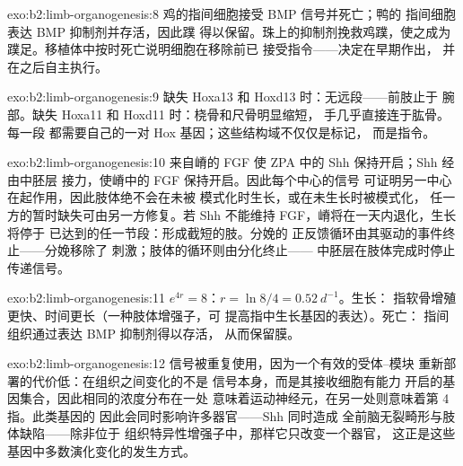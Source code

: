 \begin{solution}{exo:b2:limb-organogenesis:8}
鸡的指间细胞接受 BMP 信号并死亡；鸭的
指间细胞表达 BMP 抑制剂并存活，因此蹼
得以保留。珠上的抑制剂挽救鸡蹼，使之成为
蹼足。移植体中按时死亡说明细胞在移除前已
接受指令——决定在早期作出，
并在之后自主执行。
\end{solution}

\begin{solution}{exo:b2:limb-organogenesis:9}
缺失 Hoxa13 和 Hoxd13 时：无远段——前肢止于
腕部。缺失 Hoxa11 和 Hoxd11 时：桡骨和尺骨明显缩短，
手几乎直接连于肱骨。每一段
都需要自己的一对 Hox 基因；这些结构域不仅仅是标记，
而是指令。
\end{solution}

\begin{solution}{exo:b2:limb-organogenesis:10}
来自嵴的 FGF 使 ZPA 中的 Shh 保持开启；Shh 经由中胚层
接力，使嵴中的 FGF 保持开启。因此每个中心的信号
可证明另一中心在起作用，因此肢体绝不会在未被
模式化时生长，或在未生长时被模式化，
任一方的暂时缺失可由另一方修复。若 Shh 不能维持
FGF，嵴将在一天内退化，生长将停于
已达到的任一节段：形成截短的肢。分娩的
正反馈循环由其驱动的事件终止——分娩移除了
刺激；肢体的循环则由分化终止——
中胚层在肢体完成时停止传递信号。
\end{solution}

\begin{solution}{exo:b2:limb-organogenesis:11}
$e^{4r} = 8$：$r = \ln 8/4 = \qty{0.52}{d^{-1}}$。生长：
指软骨增殖更快、时间更长（一种肢体增强子，可
提高指中生长基因的表达）。死亡：
指间组织通过表达 BMP 抑制剂得以存活，
从而保留膜。
\end{solution}

\begin{solution}{exo:b2:limb-organogenesis:12}
信号被重复使用，因为一个有效的受体–模块
重新部署的代价低：在组织之间变化的不是
信号本身，而是其接收细胞有能力
开启的基因集合，因此相同的浓度分布在一处
意味着运动神经元，在另一处则意味着第 4 指。此类基因的
因此会同时影响许多器官——Shh 同时造成
全前脑无裂畸形与肢体缺陷——除非位于
组织特异性增强子中，那样它只改变一个器官，
这正是这些基因中多数演化变化的发生方式。
\end{solution}


